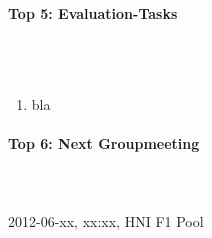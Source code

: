 \documentclass{scrartcl}
\begin{document}
\paragraph{Top 5: Evaluation-Tasks}
\hfill \\ \hfill \\
\begin {enumerate}
\item bla
\end {enumerate}

\paragraph{Top 6: Next Groupmeeting}
\hfill \\ \hfill \\
2012-06-xx, xx:xx, HNI F1 Pool
\end{document}
